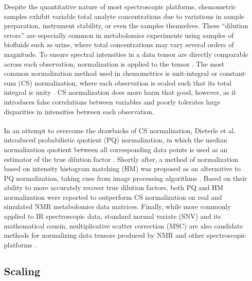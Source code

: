 \begin{doublespace}
Despite the quantitative nature of most spectroscopic platforms, chemometric
samples exhibit variable total analyte concentrations due to variations in
sample preparation, instrument stability, or even the samples themselves.
These ``dilution errors'' are especially common in metabolomics experiments
using samples of biofluids such as urine, where total concentrations may vary
several orders of magnitude. To ensure spectral intensities in a data tensor
are directly comparable across each observation, normalization is applied to
the tensor \cite{worley:cmb2013}. The most common normalization method used in
chemometrics is unit-integral or constant-sum (CS) normalization, where each
observation is scaled such that its total integral is unity
\cite{craig:anchem2006}. CS normalization does more harm that good, however,
as it introduces false correlations between variables and poorly tolerates
large disparities in intensities between each observation.
\\\\
In an attempt to overcome the drawbacks of CS normalization, Dieterle et al.
introduced probabilistic quotient (PQ) normalization, in which the median
normalization quotient between all corresponding data points is used as an
estimator of the true dilution factor \cite{dieterle:anchem2006}. Shortly
after, a method of normalization based on intensity histogram matching (HM)
was proposed as an alternative to PQ normalization, taking cues from image
processing algorithms \cite{torgrip:metab2008}. Based on their ability to
more accurately recover true dilution factors, both PQ and HM normalization
were reported to outperform CS normalization on real and simulated \hnmr{}
NMR metabolomics data matrices. Finally, while more commonly applied to
IR spectroscopic data, standard normal variate (SNV) and its mathematical
cousin, multiplicative scatter correction (MSC) are also candidate methods
for normalizing data tensors produced by NMR and other spectroscopic
platforms \cite{fearn:cils2009}.
\end{doublespace}

\subsection{Scaling}

